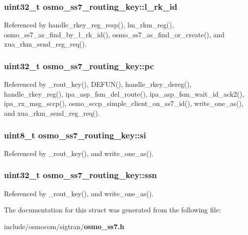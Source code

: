 \subsubsection[{l\+\_\+rk\+\_\+id}]{\setlength{\rightskip}{0pt plus 5cm}uint32\+\_\+t osmo\+\_\+ss7\+\_\+routing\+\_\+key\+::l\+\_\+rk\+\_\+id}\label{structosmo__ss7__routing__key_a6f500f329de9dc714a878be839cbc560}


Referenced by handle\+\_\+rkey\+\_\+reg\+\_\+resp(), lm\+\_\+rkm\+\_\+reg(), osmo\+\_\+ss7\+\_\+as\+\_\+find\+\_\+by\+\_\+l\+\_\+rk\+\_\+id(), osmo\+\_\+ss7\+\_\+as\+\_\+find\+\_\+or\+\_\+create(), and xua\+\_\+rkm\+\_\+send\+\_\+reg\+\_\+req().

\subsubsection[{pc}]{\setlength{\rightskip}{0pt plus 5cm}uint32\+\_\+t osmo\+\_\+ss7\+\_\+routing\+\_\+key\+::pc}\label{structosmo__ss7__routing__key_ad6d9b46e91fe14a79aba090da612a5c2}


Referenced by \+\_\+rout\+\_\+key(), D\+E\+F\+U\+N(), handle\+\_\+rkey\+\_\+dereg(), handle\+\_\+rkey\+\_\+reg(), ipa\+\_\+asp\+\_\+fsm\+\_\+del\+\_\+route(), ipa\+\_\+asp\+\_\+fsm\+\_\+wait\+\_\+id\+\_\+ack2(), ipa\+\_\+rx\+\_\+msg\+\_\+sccp(), osmo\+\_\+sccp\+\_\+simple\+\_\+client\+\_\+on\+\_\+ss7\+\_\+id(), write\+\_\+one\+\_\+as(), and xua\+\_\+rkm\+\_\+send\+\_\+reg\+\_\+req().

\subsubsection[{si}]{\setlength{\rightskip}{0pt plus 5cm}uint8\+\_\+t osmo\+\_\+ss7\+\_\+routing\+\_\+key\+::si}\label{structosmo__ss7__routing__key_a11f9961e1b0deae37f259626bf8f9573}


Referenced by \+\_\+rout\+\_\+key(), and write\+\_\+one\+\_\+as().

\subsubsection[{ssn}]{\setlength{\rightskip}{0pt plus 5cm}uint32\+\_\+t osmo\+\_\+ss7\+\_\+routing\+\_\+key\+::ssn}\label{structosmo__ss7__routing__key_aba0e325540d059be0133ed534dfe4efc}


Referenced by \+\_\+rout\+\_\+key(), and write\+\_\+one\+\_\+as().



The documentation for this struct was generated from the following file\+:\begin{DoxyCompactItemize}
\item 
include/osmocom/sigtran/{\bf osmo\+\_\+ss7.\+h}\end{DoxyCompactItemize}
